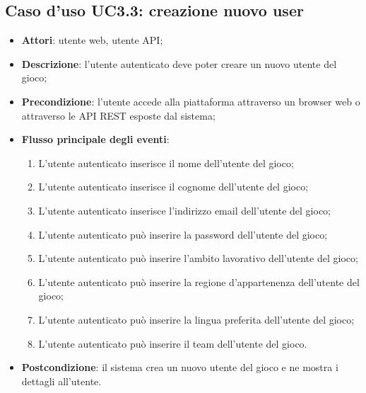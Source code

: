 \subsection{Caso d'uso UC3.3: creazione nuovo user}
\begin{itemize}
\item \textbf{Attori}: utente web, utente API;
\item \textbf{Descrizione}: l'utente autenticato deve poter creare un nuovo utente del gioco; 
      \item \textbf{Precondizione}: l'utente accede alla piattaforma attraverso un browser web o attraverso le API REST esposte dal sistema;

        \item \textbf{Flusso principale degli eventi}:
          \begin{enumerate}
          \item L'utente autenticato inserisce il nome dell'utente del gioco;
          \item L'utente autenticato inserisce il cognome dell'utente del gioco;
          \item L'utente autenticato inserisce l'indirizzo email dell'utente del gioco;
          \item L'utente autenticato può inserire la password dell'utente del gioco;
          \item L'utente autenticato può inserire l'ambito lavorativo dell'utente del gioco;
          \item L'utente autenticato può inserire la regione d'appartenenza dell'utente del gioco;
          \item L'utente autenticato può inserire la lingua preferita dell'utente del gioco;
          \item L'utente autenticato può inserire il team dell'utente del gioco.

      \end{enumerate}
    \item \textbf{Postcondizione}: il sistema crea un nuovo utente del gioco e ne mostra i dettagli all'utente.
  \end{itemize}
	
\hypertarget{UC3.4}{}
